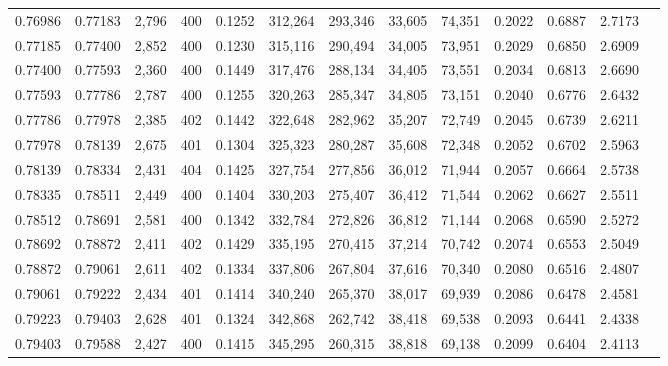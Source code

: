 \begin{tabular}{rrrrrrrrrrrrr}
0.76986 & 0.77183 & 2,796 & 400 &                                     0.1252 & 312,264 & 293,346 &  33,605 &  74,351 & 0.2022 & 0.6887 & 2.7173 \\
0.77185 & 0.77400 & 2,852 & 400 &                                     0.1230 & 315,116 & 290,494 &  34,005 &  73,951 & 0.2029 & 0.6850 & 2.6909 \\
0.77400 & 0.77593 & 2,360 & 400 &                                     0.1449 & 317,476 & 288,134 &  34,405 &  73,551 & 0.2034 & 0.6813 & 2.6690 \\
0.77593 & 0.77786 & 2,787 & 400 &                                     0.1255 & 320,263 & 285,347 &  34,805 &  73,151 & 0.2040 & 0.6776 & 2.6432 \\
0.77786 & 0.77978 & 2,385 & 402 &                                     0.1442 & 322,648 & 282,962 &  35,207 &  72,749 & 0.2045 & 0.6739 & 2.6211 \\
0.77978 & 0.78139 & 2,675 & 401 &                                     0.1304 & 325,323 & 280,287 &  35,608 &  72,348 & 0.2052 & 0.6702 & 2.5963 \\
0.78139 & 0.78334 & 2,431 & 404 &                                     0.1425 & 327,754 & 277,856 &  36,012 &  71,944 & 0.2057 & 0.6664 & 2.5738 \\
0.78335 & 0.78511 & 2,449 & 400 &                                     0.1404 & 330,203 & 275,407 &  36,412 &  71,544 & 0.2062 & 0.6627 & 2.5511 \\
0.78512 & 0.78691 & 2,581 & 400 &                                     0.1342 & 332,784 & 272,826 &  36,812 &  71,144 & 0.2068 & 0.6590 & 2.5272 \\
0.78692 & 0.78872 & 2,411 & 402 &                                     0.1429 & 335,195 & 270,415 &  37,214 &  70,742 & 0.2074 & 0.6553 & 2.5049 \\
0.78872 & 0.79061 & 2,611 & 402 &                                     0.1334 & 337,806 & 267,804 &  37,616 &  70,340 & 0.2080 & 0.6516 & 2.4807 \\
0.79061 & 0.79222 & 2,434 & 401 &                                     0.1414 & 340,240 & 265,370 &  38,017 &  69,939 & 0.2086 & 0.6478 & 2.4581 \\
0.79223 & 0.79403 & 2,628 & 401 &                                     0.1324 & 342,868 & 262,742 &  38,418 &  69,538 & 0.2093 & 0.6441 & 2.4338 \\
0.79403 & 0.79588 & 2,427 & 400 &                                     0.1415 & 345,295 & 260,315 &  38,818 &  69,138 & 0.2099 & 0.6404 & 2.4113 \\

\end{tabular}
